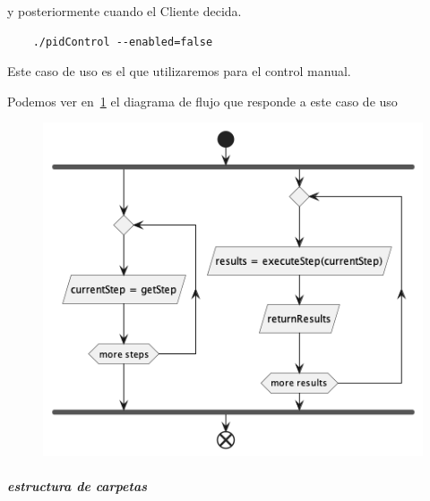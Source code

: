 y posteriormente cuando el Cliente decida.

\begin{verbatim}
    ./pidControl --enabled=false
\end{verbatim}

Este caso de uso es el que utilizaremos para el control manual.

Podemos ver en~\ref{fig:executeBidiStep} el diagrama de flujo que responde a este caso de uso

\begin{figure}[H]
    \centering
    \includegraphics[height=0.2\textheight]{./part/Proyecto_ejecutivo/memoria_descriptiva/descripcionDelProyecto/client/uml/executeBidiStep}
    \caption[Diagrama de objetos de dominio]{}\label{fig:executeBidiStep}
\end{figure}

\subparagraph{estructura de carpetas}







